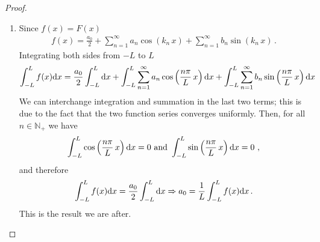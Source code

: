 \begin{proof}
	\begin{enumerate}
		\item Since $f(x)=F(x)$  
			\begin{eqnarray}
				\label{eq:f=F}
				f(x) =  \frac{a_0}{2} + \sum_{n=1}^\infty a_n \cos\left(k_n \, x\right) 
										+ \sum_{n=1}^\infty b_n \sin\left(k_n\, x\right) \, .
			\end{eqnarray}
			Integrating both sides from $-L$ to $L$ 
		\begin{eqnarray}
			 \int_{-L}^{L}f(x) \mathrm{d} x = \frac{a_0}{2} \int_{-L}^L \mathrm{d} x + \int_{-L}^L \sum_{n=1}^\infty a_n 
				\cos\left(\frac{n\pi }{L} \, x\right) \mathrm{d} x + \int_{-L}^L \sum_{n=1}^\infty b_n \sin\left(\frac{n\pi 
				}{L} \, x\right) \mathrm{d} x \nonumber \\
		\end{eqnarray}
		We can interchange integration and summation in the last two terms; this is due to the fact that 
		the two function series converges uniformly. Then, for all $n \in \mathbb{N}_+$ we have  
		\begin{equation}
			\int_{-L}^L  \cos\left(\frac{n\pi }{L} \, x\right) \d x = 0 \ \text{and} \ 
			\int_{-L}^L  \sin\left(\frac{n\pi }{L} \, x\right) \d x = 0 \ , 
		\end{equation}
		and therefore
		\begin{equation}
			\label{eq:a0}
			 \int_{-L}^L f(x) \mathrm{d} x = \frac{a_0}{2}   \int_{-L}^L \mathrm{d} x
			 \Rightarrow a_0 = \frac{1}{L} \int_{-L}^L f(x) \mathrm{d} x \, . 
		\end{equation}
		This is the result we are after.
		

\end{enumerate}
\end{proof}
